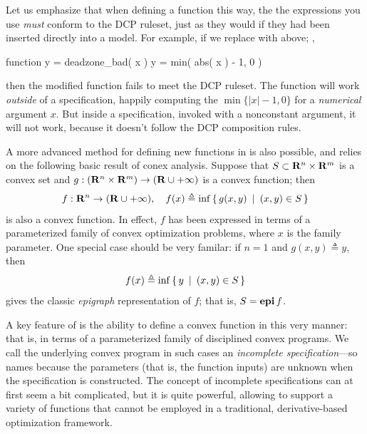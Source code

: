 \documentclass[12pt]{article}
\begin{document}
Let us emphasize that when defining a function this way, the
the expressions you use \emph{must} conform to the DCP ruleset, just as
they would if they had been inserted directly into a \cvx model. For
example, if we replace \verb@max@ with \verb@min@ above; \eg,
\begin{code}
	function y = deadzone_bad( x )
	y = min( abs( x ) - 1, 0 )
\end{code}
then the modified function fails to meet the DCP ruleset. The
function will work \emph{outside} of a \cvx specification,
happily computing
the $\min \{|x|-1,0\}$ for a \emph{numerical}
argument $x$. But inside a \cvx specification, invoked 
with a nonconstant argument, it will not work, because
it doesn't follow the DCP composition rules.

A more advanced method for defining new functions in \cvx
is also possible, and relies on the following basic result of conex
analysis.
Suppose that $S\subset\R^n\times\R^m$ is a convex set and 
$g:(\R^n\times\R^m)\rightarrow(\R\cup+\infty)$ is a convex function; then
\begin{equation}
	\label{eq:partial}
	f:\R^n\rightarrow(\R\cup+\infty), \quad f(x) \triangleq \inf\Condset{g(x,y)}{(x,y)\in S }
\end{equation}
is also a convex function. In effect, $f$
has been expressed in terms of a parameterized 
family of convex optimization problems, where $x$ is
the family parameter.
One special case should be very familar: if $n=1$ and
$g(x,y)\triangleq y$, then
\begin{equation}
	f(x) \triangleq \inf\left\{\,y\,~|~\,(x,y)\in S\,\right\}
\end{equation}
gives the classic \emph{epigraph} representation of $f$; that is, $S=\operatorname{\textbf{epi}} f$.

A key feature of \cvx is the ability to define a convex
function in this very manner: that is, in terms of a 
parameterized family of disciplined convex programs. 
We call the underlying convex program in such cases
an \emph{incomplete specification}---so names because
the parameters (that is, the function inputs)
are unknown when the specification is
constructed. The concept of incomplete 
specifications can at first seem a bit complicated,
but it is quite powerful, allowing
\cvx to support a variety of functions that cannot be
employed in a traditional, derivative-based optimization framework.
\end{document}
